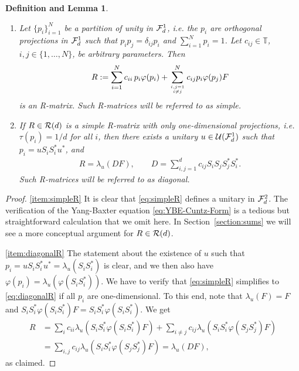 \documentclass[12pt,a4paper]{amsart}
\numberwithin{equation}{section}
\newtheorem{definitionlemma}[theorem]{Definition and Lemma}
\theoremstyle{remark}
\def\T{\mathbb{T}}
\newcommand{\la}{\lambda}
\newcommand{\CU}[0]{\mathcal{U}} \newcommand{\CV}[0]{\mathcal{V}}
\begin{document}
\begin{definitionlemma}\label{def:diagonalR}\leavevmode
    \begin{enumerate}
     \item\label{item:simpleR} Let $\{p_i\}_{i=1}^N$ be a partition of unity in $\mathcal{F}_d^1$, i.e. the $p_i$ are orthogonal projections in $\mathcal{F}_d^1$ such that $p_ip_j=\delta_{ij}p_i$ and $\sum_{i=1}^Np_i=1$. Let $c_{ij}\in\T$, $i,j\in\{1,\ldots,N\}$, be arbitrary parameters. Then
    \begin{align}\label{eq:simpleR}
        R
        :=
        \sum_{i=1}^N c_{ii}\,p_i\varphi(p_i)+\sum_{
        \genfrac{}{}{0pt}{2}{i,j=1}{i\neq j}
        }^N c_{ij}p_i\varphi(p_j)F
    \end{align}
    is an R-matrix.  Such R-matrices will be referred to as {\em simple}.
    
    \item\label{item:diagonalR} If $R\in\mathcal{R}(d)$ is a simple R-matrix with only one-dimensional projections, i.e. $\tau(p_i)=1/d$ for all $i$, then there exists a unitary $u\in\CU(\CF_d^1)$ such that $p_i=uS_iS_i^*u^*$, and 
    \begin{align}\label{eq:diagonalR}
        R=\la_u(DF),\qquad D=\sum_{i,j=1}^dc_{ij}S_iS_jS_j^*S_i^*.
    \end{align}
    Such R-matrices will be referred to as {\em diagonal}.
    \end{enumerate}
\end{definitionlemma}
\begin{proof}
    \ref{item:simpleR} It is clear that \eqref{eq:simpleR} defines a unitary in $\mathcal{F}_d^2$. The verification of the Yang-Baxter equation \eqref{eq:YBE-Cuntz-Form} is a tedious but straightforward calculation that we omit here. In Section~\ref{section:sums} we will see a more conceptual argument for $R\in\mathcal{R}(d)$.
    
    \ref{item:diagonalR} The statement about the existence of $u$ such that $p_i=uS_iS_i^*u^*=\la_u(S_iS_i^*)$ is clear, and we then also have $\varphi(p_i)=\la_u(\varphi(S_iS_i^*))$. We have to verify that \eqref{eq:simpleR} simplifies to \eqref{eq:diagonalR} if all $p_i$ are one-dimensional. To this end, note that $\la_u(F)=F$ and $S_iS_i^*\varphi(S_iS_i^*)F=S_iS_i^*\varphi(S_iS_i^*)$. We get   
    \begin{align*}
        R
        &=
        \sum_i c_{ii}\la_u(S_iS_i^*\varphi(S_iS_i^*)F)
        +
        \sum_{i\neq j}c_{ij}\la_u(S_iS_i^*\varphi(S_jS_j^*)F)
        \\
        &=
        \sum_{i,j}c_{ij}\la_u(S_iS_i^*\varphi(S_jS_j^*)F)
        =
        \la_u(DF)
        ,
    \end{align*}
    as claimed.
\end{proof}
\end{document}
